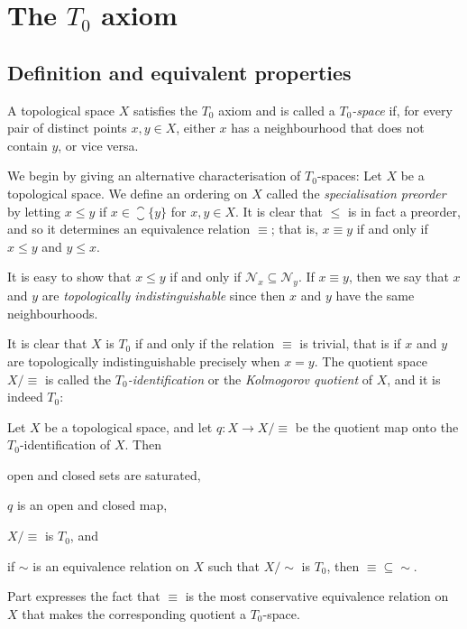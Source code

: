 \documentclass[article, a4paper, 11pt, oneside]{memoir}
\numberwithin{equation}{chapter}
\newcommand{\calN}{\mathcal{N}}
\newcommand{\nhoodfilter}[1]{\calN_{#1}}
\begin{document}
\chapter[The T0 axiom][The $T_0$ axiom]{The $T_0$ axiom}

\section{Definition and equivalent properties}

\begin{definition}
    A topological space $X$ satisfies the $T_0$ axiom and is called a \emph{$T_0$-space} if, for every pair of distinct points $x,y \in X$, either $x$ has a neighbourhood that does not contain $y$, or vice versa.
\end{definition}

We begin by giving an alternative characterisation of $T_0$-spaces: Let $X$ be a topological space. We define an ordering on $X$ called the \emph{specialisation preorder} by letting $x \leq y$ if $x \in \closure{\{y\}}$ for $x,y \in X$. It is clear that $\leq$ is in fact a preorder, and so it determines an equivalence relation $\equiv$; that is, $x \equiv y$ if and only if $x \leq y$ and $y \leq x$.

It is easy to show that $x \leq y$ if and only if $\nhoodfilter{x} \subseteq \nhoodfilter{y}$.  If $x \equiv y$, then we say that $x$ and $y$ are \emph{topologically indistinguishable} since then $x$ and $y$ have the same neighbourhoods.

It is clear that $X$ is $T_0$ if and only if the relation $\equiv$ is trivial, that is if $x$ and $y$ are topologically indistinguishable precisely when $x = y$. The quotient space $X/{\equiv}$ is called the \emph{$T_0$-identification} or the \emph{Kolmogorov quotient} of $X$, and it is indeed $T_0$:

\begin{theorem}
    Let $X$ be a topological space, and let $q \colon X \to X/{\equiv}$ be the quotient map onto the $T_0$-identification of $X$. Then
    \begin{enumthm}
        \item \label{enum:T0-identification-saturated} open and closed sets are saturated,
        \item $q$ is an open and closed map,
        \item $X/{\equiv}$ is $T_0$, and
        \item \label{enum:T0-identification-is-smallest-equiv} if $\sim$ is an equivalence relation on $X$ such that $X/{\sim}$ is $T_0$, then ${\equiv} \subseteq {\sim}$.\footnotemark
    \end{enumthm}
\end{theorem}
%
Part  expresses the fact that $\equiv$ is the most conservative equivalence relation on $X$ that makes the corresponding quotient a $T_0$-space.
\end{document}

